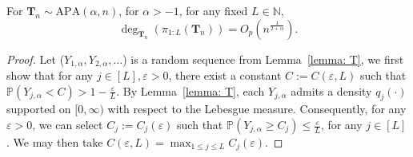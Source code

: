 \documentclass[twoside,11pt]{article}
\theoremstyle{remark}
\begin{document}
\begin{lemma}
   \label{lemma deg bound}
For $\boldsymbol{T}_{n}\sim \mathrm{APA}\left(\alpha, n\right)$, for $\alpha>-1$, for any fixed $L\in \mathbb{N}$, 
%
$$
\operatorname{deg}_{\boldsymbol{T}_n}\left(\pi_{1:L}\left(\boldsymbol{T}_n\right)\right)=O_p\left(n^{\frac{1}{2+\alpha}}\right).
$$
% 
\end{lemma}
\begin{proof}
Let ($Y_{1,\alpha}, Y_{2,\alpha}, \ldots$) is a random sequence from Lemma~\ref{lemma: T},
we first show that for any $j \in\left[L\right], \varepsilon>0$, there exist a constant $C:=C(\varepsilon,L)$ such that $\mathbb{P}\left(Y_{j, \alpha}< C\right)>1-\frac{\varepsilon}{L}$.
By Lemma~\ref{lemma: T}, each $Y_{j, \alpha}$ admits a density $q_j(\cdot)$ supported on $[0,\infty)$ with respect to the Lebesgue measure. Consequently, for any $\varepsilon > 0$, we can select $C_j:=C_j\left(\varepsilon\right)$ such that $\mathbb{P}\left(Y_{j, \alpha}\geq  C_j\right)\le \frac{\varepsilon}{L}$, for any $j \in \left[L\right]$. We may then take $C(\varepsilon,L)=\max_{1\le j \le L}C_j(\varepsilon)$. 


\end{proof}
\end{document}

